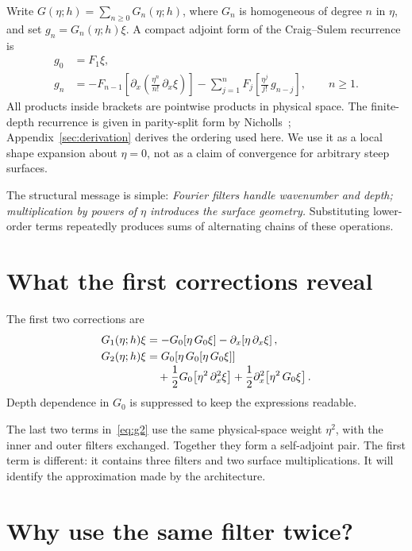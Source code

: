 \documentclass[11pt,letterpaper]{article}
\begin{document}
Write $G(\eta;h)=\sum_{n\geq0}G_n(\eta;h)$, where $G_n$ is homogeneous
of degree $n$ in $\eta$, and set $g_n=G_n(\eta;h)\xi$. A compact adjoint
form of the Craig--Sulem recurrence is
\begin{align}
  g_0 &= F_1\xi,\\
  g_n &= -F_{n-1}\!\left[\partial_x\!\left(
                  \frac{\eta^n}{n!}\,\partial_x\xi\right)\right]
          -\sum_{j=1}^{n}F_j\!\left[\frac{\eta^j}{j!}\,g_{n-j}\right],
          \qquad n\geq1.
  \label{eq:recurrence}
\end{align}
All products inside brackets are pointwise products in physical space.
The finite-depth recurrence is given in parity-split form by
Nicholls~\cite{nicholls1998}; Appendix~\ref{sec:derivation} derives the
ordering used here. We use it as a local shape expansion about $\eta=0$,
not as a claim of convergence for arbitrary steep surfaces.

The structural message is simple: \emph{Fourier filters handle wavenumber
and depth; multiplication by powers of $\eta$ introduces the surface geometry.}
Substituting lower-order terms repeatedly produces sums of alternating chains
of these operations.

\section{What the first corrections reveal}

The first two corrections are~\cite{wilkening2015}
\begin{align}
  G_1(\eta;h)\xi
    &= -G_0\!\left[\eta\,G_0\xi\right]
       -\partial_x\!\left[\eta\,\partial_x\xi\right],
       \label{eq:g1}\\
  G_2(\eta;h)\xi
    &= G_0\!\left[\eta\,G_0\!\left[\eta\,G_0\xi\right]\right]
       \notag\\[-2pt]
    &\quad+\frac12G_0\!\left[\eta^2\,\partial_x^2\xi\right]
       +\frac12\partial_x^2\!\left[\eta^2\,G_0\xi\right].
       \label{eq:g2}
\end{align}
Depth dependence in $G_0$ is suppressed to keep the expressions readable.

The last two terms in~\eqref{eq:g2} use the same physical-space weight
$\eta^2$, with the inner and outer filters exchanged. Together they form a
self-adjoint pair. The first term is different: it contains three filters
and two surface multiplications. It will identify the approximation made by
the architecture.

\section{Why use the same filter twice?}
\end{document}
